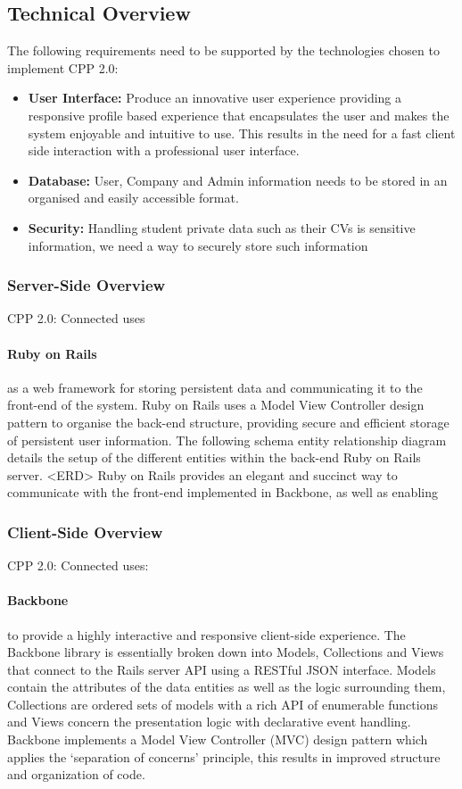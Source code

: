 \subsection{Technical Overview}
	The following requirements need to be supported by the technologies chosen to implement CPP 2.0:
		\begin{itemize}
		  \item \textbf{User Interface:} Produce an innovative user experience providing a responsive profile based experience that encapsulates the user and makes the system enjoyable and intuitive to use. This results in the need for a fast client side interaction with a professional user interface.
		  \item \textbf{Database:} User, Company and Admin information needs to be stored in an organised and easily accessible format.
		  \item \textbf{Security:} Handling student private data such as their CVs is sensitive information, we need a way to securely store such information 
		\end{itemize} 

	\subsubsection{Server-Side Overview}
		CPP 2.0: Connected uses
		\paragraph{Ruby on Rails\cite{ror}} as a web framework for storing persistent data and communicating it to the front-end of the system. Ruby on Rails uses a Model View Controller design pattern to organise the back-end structure, providing secure and efficient storage of persistent user information. The following schema entity relationship diagram details the setup of the different entities within the back-end Ruby on Rails server.
		<ERD>
		Ruby on Rails provides an elegant and succinct way to communicate with the front-end implemented in Backbone, as well as enabling  

	\subsubsection{Client-Side Overview}
		CPP 2.0: Connected uses:
		\paragraph{Backbone\cite{backbone}} to provide a highly interactive and responsive client-side experience. The Backbone library is essentially broken down into Models, Collections and Views that connect to the Rails server API using a RESTful JSON interface. Models contain the attributes of the data entities as well as the logic surrounding them, Collections are ordered sets of models with a rich API of enumerable functions and Views concern the presentation logic with declarative event handling. Backbone implements a Model View Controller (MVC) design pattern which applies the ‘separation of  concerns’ principle, this results in improved structure and organization of code.
